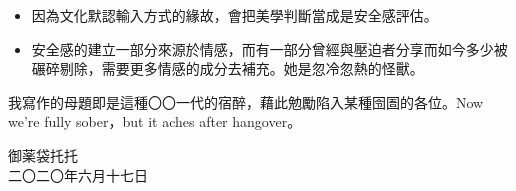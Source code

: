 \documentclass[10pt]{article}
\providecommand{\tightlist}{\setlength{\itemsep}{0pt}\setlength{\parskip}{0pt}}
\begin{document}
\begin{itemize}
\tightlist
\item
  因為文化默認輸入方式的緣故，會把美學判斷當成是安全感評估。
\item
  安全感的建立一部分來源於情感，而有一部分曾經與壓迫者分享而如今多少被碾碎剔除，需要更多情感的成分去補充。她是忽冷忽熱的怪獸。
\end{itemize}

我寫作的母題即是這種〇〇一代的宿醉，藉此勉勵陷入某種囹圄的各位。Now
we're fully sober，but it aches after hangover。

\vspace{3em}
\begin{flushleft}
\small{御薬袋托托\\
二〇二〇年六月十七日}
\end{flushleft}
\end{document}
